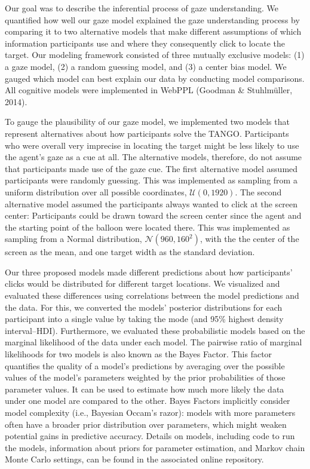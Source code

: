\documentclass[
  man,mask,floatsintext]{apa6}
\begin{document}
Our goal was to describe the inferential process of gaze understanding. We quantified how well our gaze model explained the gaze understanding process by comparing it to two alternative models that make different assumptions of which information participants use and where they consequently click to locate the target. Our modeling framework consisted of three mutually exclusive models: (1) a gaze model, (2) a random guessing model, and (3) a center bias model. We gauged which model can best explain our data by conducting model comparisons. All cognitive models were implemented in WebPPL (Goodman \& Stuhlmüller, 2014).

To gauge the plausibility of our gaze model, we implemented two models that represent alternatives about how participants solve the TANGO. Participants who were overall very imprecise in locating the target might be less likely to use the agent's gaze as a cue at all. The alternative models, therefore, do not assume that participants made use of the gaze cue. The first alternative model assumed participants were randomly guessing. This was implemented as sampling from a uniform distribution over all possible coordinates, \(\mathcal{U}(0, 1920)\). The second alternative model assumed the participants always wanted to click at the screen center: Participants could be drawn toward the screen center since the agent and the starting point of the balloon were located there. This was implemented as sampling from a Normal distribution, \(\mathcal{N}(960, 160^2)\), with the the center of the screen as the mean, and one target width as the standard deviation.

Our three proposed models made different predictions about how participants' clicks would be distributed for different target locations. We visualized and evaluated these differences using correlations between the model predictions and the data. For this, we converted the models' posterior distributions for each participant into a single value by taking the mode (and 95\% highest density interval--HDI). Furthermore, we evaluated these probabilistic models based on the marginal likelihood of the data under each model. The pairwise ratio of marginal likelihoods for two models is also known as the Bayes Factor. This factor quantifies the quality of a model's predictions by averaging over the possible values of the model's parameters weighted by the prior probabilities of those parameter values. It can be used to estimate how much more likely the data under one model are compared to the other. Bayes Factors implicitly consider model complexity (i.e., Bayesian Occam's razor): models with more parameters often have a broader prior distribution over parameters, which might weaken potential gains in predictive accuracy. Details on models, including code to run the models, information about priors for parameter estimation, and Markov chain Monte Carlo settings, can be found in the associated online repository.
\end{document}
